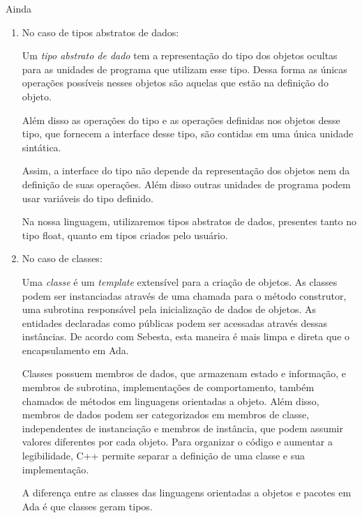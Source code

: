 Ainda\begin{enumerate}
        \item
        No caso de tipos abstratos de dados:

        Um \emph{tipo abstrato de dado} tem a representação do tipo dos objetos
        ocultas para as unidades de programa que utilizam esse tipo. Dessa forma as
        únicas operações possíveis nesses objetos são aquelas que estão na
        definição do objeto.

        Além disso as operações do tipo e as operações definidas nos objetos
        desse tipo, que fornecem a interface desse tipo, são contidas em uma
        única unidade sintática.

        Assim,  a interface do tipo não depende da representação dos objetos
        nem da definição de suas operações. Além disso outras unidades de
        programa podem usar variáveis do tipo definido.

        Na nossa linguagem, utilizaremos tipos abstratos de dados, presentes
        tanto no tipo float, quanto em tipos criados pelo usuário.

		\item
        No caso de classes:

        Uma \emph{classe} é um \emph{template} extensível para a criação de
        objetos. As classes podem ser instanciadas através de uma chamada para
        o método construtor, uma subrotina responsável pela inicialização de
        dados de objetos. As entidades declaradas como públicas podem ser
        acessadas através dessas instâncias. De acordo com Sebesta, esta
        maneira é mais limpa e direta que o encapsulamento em Ada.

        Classes possuem membros de dados, que armazenam estado e informação, e
        membros de subrotina, implementações de comportamento, também chamados
        de métodos em linguagens orientadas a objeto. Além disso, membros de
        dados podem ser categorizados em membros de classe, independentes de
        instanciação e membros de instância, que podem assumir valores
        diferentes por cada objeto. Para organizar o código e aumentar a
        legibilidade, C++ permite separar a definição de uma classe e sua
        implementação.

        A diferença entre as classes das linguagens orientadas a objetos e
        pacotes em Ada é que classes geram tipos.
        

\end{enumerate}
